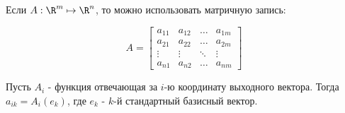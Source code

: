 \begin{remark} \thmslashn

    Если $A : \R^{m} \mapsto \R^{n}$, то можно использовать матричную запись:

    \begin{equation*}
        A = \begin{bmatrix} 
            a_{11} & a_{12} & \ldots & a_{1m}\\
            a_{21} & a_{22} & \ldots & a_{2m}\\
            \vdots & \vdots & \ddots & \vdots\\
            a_{n1} & a_{n2} & \ldots & a_{nm} 
        \end{bmatrix}
    \end{equation*}

    Пусть $A_{i}$ - функция отвечающая за $i$-ю координату выходного вектора. Тогда $a_{ik} = A_{i}(e_{k})$, где $e_{k}$ - $k$-й стандартный базисный вектор.
\end{remark}
